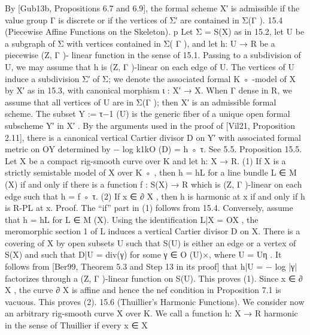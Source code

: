 \documentclass[
  10pt,
]{article}
\newenvironment{Shaded}{}{}
\newcommand{\NormalTok}[1]{#1}
\begin{document}
\begin{Shaded}
\begin{Highlighting}[]
\NormalTok{By [Gub13b, Propositions 6.7 and 6.9], the formal scheme X′ is admissible if the value}
\NormalTok{group Γ is discrete or if the vertices of Σ′ are contained in Σ(Γ ).}
\NormalTok{15.4 (Piecewise Affine Functions on the Skeleton).}
\NormalTok{                                             p         Let Σ = S(X) as in 15.2, let U be a}
\NormalTok{subgraph of Σ with vertices contained in Σ( Γ ), and let h: U → R be a piecewise (Z, Γ ){-}}
\NormalTok{linear function in the sense of 15.1. Passing to a subdivision of U, we may assume that}
\NormalTok{h is (Z, Γ ){-}linear on each edge of U. The vertices of U induce a subdivision Σ′ of Σ; we}
\NormalTok{denote the associated formal K ◦ {-}model of X by X′ as in 15.3, with canonical morphism}
\NormalTok{ι : X′ → X. When Γ dense in R, we assume that all vertices of U are in Σ(Γ ); then}
\NormalTok{X′ is an admissible formal scheme. The subset Y := τ−1 (U) is the generic fiber of a}
\NormalTok{unique open formal subscheme Y′ in X′ . By the arguments used in the proof of [Vil21,}
\NormalTok{Proposition 2.11], there is a canonical vertical Cartier divisor D on Y′ with associated}
\NormalTok{formal metric on OY determined by − log k1kO (D) = h ◦ τ. See 5.5.}
\NormalTok{Proposition 15.5. Let X be a compact rig{-}smooth curve over K and let h: X → R.}
\NormalTok{     (1) If X is a strictly semistable model of X over K ◦ , then h = hL for a line bundle}
\NormalTok{         L ∈ M (X) if and only if there is a function f : S(X) → R which is (Z, Γ ){-}linear on}
\NormalTok{         each edge such that h = f ◦ τ.}
\NormalTok{     (2) If x ∈ ∂ X , then h is harmonic at x if and only if h is R{-}PL at x.}
\NormalTok{Proof. The “if” part in (1) follows from 15.4. Conversely, assume that h = hL for L ∈}
\NormalTok{M (X). Using the identification L|X = OX , the meromorphic section 1 of L induces a}
\NormalTok{vertical Cartier divisor D on X. There is a covering of X by open subsets U such that S(U)}
\NormalTok{is either an edge or a vertex of S(X) and such that D|U = div(γ) for some γ ∈ O (U)×,}
\NormalTok{where U = Uη . It follows from [Ber99, Theorem 5.3 and Step 13 in its proof] that}
\NormalTok{h|U = − log |γ| factorizes through a (Z, Γ ){-}linear function on S(U). This proves (1).}
\NormalTok{   Since x ∈ ∂ X , the curve ∂ X is affine and hence the nef condition in Proposition 7.1 is}
\NormalTok{vacuous. This proves (2).                                                                 }
\NormalTok{15.6 (Thuillier’s Harmonic Functions). We consider now an arbitrary rig{-}smooth curve}
\NormalTok{X over K. We call a function h: X → R harmonic in the sense of Thuillier if every x ∈ X}

\end{Highlighting}
\end{Shaded}
\end{document}
